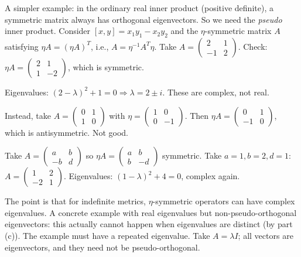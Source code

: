 \documentclass[12pt]{article}
\begin{document}
A simpler example: in the ordinary real inner product (positive definite), a symmetric matrix always has orthogonal eigenvectors. So we need the \emph{pseudo} inner product. Consider $[x,y] = x_1 y_1 - x_2 y_2$ and the $\eta$-symmetric matrix $A$ satisfying $\eta A = (\eta A)^T$, i.e., $A = \eta^{-1}A^T\eta$. Take $A = \begin{pmatrix} 2 & 1 \\ -1 & 2\end{pmatrix}$. Check: $\eta A = \begin{pmatrix} 2 & 1 \\ 1 & -2\end{pmatrix}$, which is symmetric. \checkmark

Eigenvalues: $(2-\lambda)^2 + 1 = 0 \Rightarrow \lambda = 2\pm i$. These are complex, not real.

Instead, take $A = \begin{pmatrix} 0 & 1 \\ 1 & 0\end{pmatrix}$ with $\eta = \begin{pmatrix} 1 & 0 \\ 0 & -1\end{pmatrix}$. Then $\eta A = \begin{pmatrix} 0 & 1 \\ -1 & 0\end{pmatrix}$, which is antisymmetric. Not good.

Take $A = \begin{pmatrix} a & b \\ -b & d\end{pmatrix}$ so $\eta A = \begin{pmatrix} a & b \\ b & -d\end{pmatrix}$ symmetric. Take $a=1, b=2, d=1$: $A = \begin{pmatrix} 1 & 2 \\ -2 & 1\end{pmatrix}$. Eigenvalues: $(1-\lambda)^2 + 4 = 0$, complex again.

The point is that for indefinite metrics, $\eta$-symmetric operators can have complex eigenvalues. A concrete example with real eigenvalues but non-pseudo-orthogonal eigenvectors: this actually cannot happen when eigenvalues are distinct (by part (c)). The example must have a repeated eigenvalue. Take $A = \lambda I$; all vectors are eigenvectors, and they need not be pseudo-orthogonal.
\end{document}
